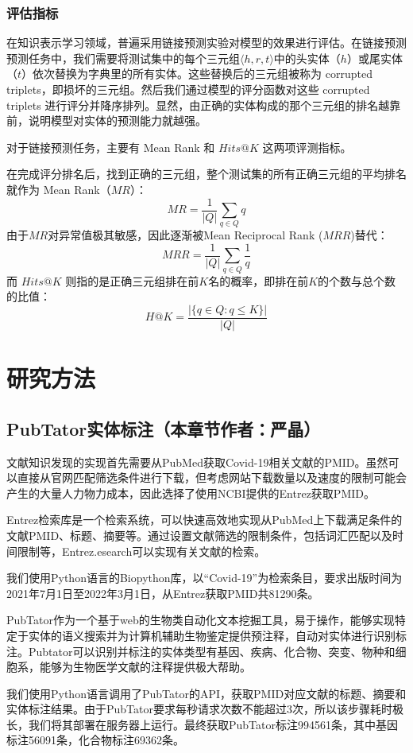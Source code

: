 \documentclass[twocolumn]{article}
\begin{document}
\subsubsection{评估指标}
在知识表示学习领域，普遍采用链接预测实验对模型的效果进行评估。在链接预测预测任务中，我们需要将测试集中的每个三元组$\langle h, r, t\rangle$中的头实体（$h$）或尾实体（$t$）依次替换为字典里的所有实体。这些替换后的三元组被称为 corrupted triplets，即损坏的三元组。然后我们通过模型的评分函数对这些 corrupted triplets 进行评分并降序排列。显然，由正确的实体构成的那个三元组的排名越靠前，说明模型对实体的预测能力就越强。\par
对于链接预测任务，主要有 Mean Rank 和 $Hits@K$ 这两项评测指标。\par
在完成评分排名后，找到正确的三元组，整个测试集的所有正确三元组的平均排名就作为 Mean Rank（$MR$）：
$$MR=\frac{1}{|Q|} \sum_{q \in Q} q$$
由于$MR$对异常值极其敏感，因此逐渐被Mean Reciprocal Rank ($MRR$)替代：
$$MRR=\frac{1}{|Q|} \sum_{q \in Q} \frac{1}{q}$$
而 $Hits@K$ 则指的是正确三元组排在前$K$名的概率，即排在前$K$的个数与总个数的比值：
$$H @ K=\frac{|\{q \in Q: q \leq K\}|}{|Q|}$$


\section{研究方法}

\subsection{PubTator实体标注（本章节作者：严晶）\label{data_access}}
文献知识发现的实现首先需要从PubMed获取Covid-19相关文献的PMID。虽然可以直接从官网匹配筛选条件进行下载，但考虑网站下载数量以及速度的限制可能会产生的大量人力物力成本，因此选择了使用NCBI提供的Entrez获取PMID。\par
Entrez检索库是一个检索系统，可以快速高效地实现从PubMed上下载满足条件的文献PMID、标题、摘要等。通过设置文献筛选的限制条件，包括词汇匹配以及时间限制等，Entrez.esearch可以实现有关文献的检索。\par
我们使用Python语言的Biopython库，以“Covid-19”为检索条目，要求出版时间为2021年7月1日至2022年3月1日，从Entrez获取PMID共81290条。\par
PubTator作为一个基于web的生物类自动化文本挖掘工具，易于操作，能够实现特定于实体的语义搜索并为计算机辅助生物鉴定提供预注释，自动对实体进行识别标注。Pubtator可以识别并标注的实体类型有基因、疾病、化合物、突变、物种和细胞系，能够为生物医学文献的注释提供极大帮助。\par
我们使用Python语言调用了PubTator的API，获取PMID对应文献的标题、摘要和实体标注结果。由于PubTator要求每秒请求次数不能超过3次，所以该步骤耗时极长，我们将其部署在服务器上运行。最终获取PubTator标注994561条，其中基因标注56091条，化合物标注69362条。\par
\end{document}
